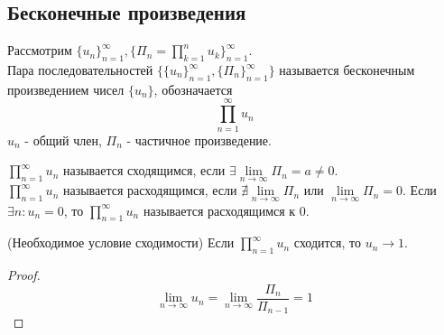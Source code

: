 \subsection{Бесконечные произведения}
\begin{definition}
    Рассмотрим $\{u_n\}_{n=1}^{\infty}, \{\Pi_n = \prod \limits_{k=1}^{n}u_k\}_{n=1}^{\infty}$.\\
    Пара последовательностей $\{\{u_n\}_{n=1}^{\infty}, \{\Pi_n\}_{n=1}^{\infty}\}$ называется бесконечным произведением чисел $\{u_n\}$, обозначается 
    \[\prod \limits_{n=1}^{\infty}u_n\]
    $u_n$ - общий член, $\Pi_n$ - частичное произведение.
\end{definition}
\begin{definition}
    $\prod \limits_{n=1}^{\infty}u_n$ называется сходящимся, если $\exists \lim \limits_{n\rightarrow \infty} \Pi_n = a \neq 0$.\\
    $\prod \limits_{n=1}^{\infty}u_n$ называется расходящимся, если $\nexists \lim \limits_{n\rightarrow \infty} \Pi_n$ или $\lim \limits_{n\rightarrow \infty} \Pi_n = 0$.
    Если $\exists n: u_n = 0$, то $\prod \limits_{n=1}^{\infty}u_n$ называется расходящимся к 0.
\end{definition}
\begin{theorem}(Необходимое условие сходимости)
    Если $\prod \limits_{n=1}^{\infty}u_n$ сходится, то $u_n \rightarrow 1$.
\end{theorem}
\begin{proof}
    \[\lim \limits_{n \rightarrow \infty} u_n = \lim \limits_{n \rightarrow \infty} \frac{\Pi_n}{\Pi_{n-1}} = 1\]
\end{proof}
